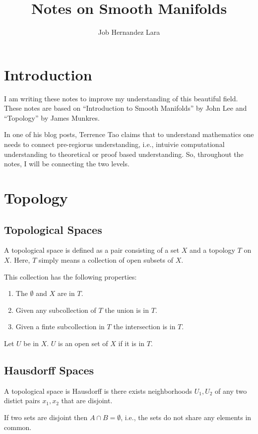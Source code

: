 \documentclass{article}
\title{Notes on Smooth Manifolds}
\author{Job Hernandez Lara}
\date{}
\begin{document}
\maketitle

\section{Introduction}
I am writing these notes to improve my understanding of this beautiful field.
These notes are based on ``Introduction to Smooth Manifolds'' by John Lee and ``Topology'' by James Munkres.

In one of his blog posts, Terrence Tao claims that to understand mathematics one needs to connect pre-regiorus understanding, i.e., intuivie computational understanding to theoretical or proof based understanding. So, throughout the notes, I will be connecting the two levels.

\section{Topology}

\subsection{Topological Spaces}

A topological space is defined as a pair consisting of a set $ X $ and a topology $ T $ on $ X $. Here, $ T $ simply means a collection of open subsets of $ X $.

This collection has the following properties:

\begin{enumerate}
\item The $ \emptyset $ and $ X $ are in $ T $.
\item Given any subcollection of $ T $ the union is in $ T $.
\item Given a finte subcollection in $ T $ the intersection is in $ T $.
\end{enumerate}

Let $ U $ be in $ X $. $ U $ is an open set of $ X $ if it is in $ T $.
\subsection{Hausdorff Spaces}
A topological space is Hausdorff is there exists neighborhoods $ U_{1}, U_{2} $ of any two distict pairs $ x_{1}, x_{2} $ that are disjoint.

If two sets are disjoint then $ A \cap B = \emptyset $, i.e., the sets do not share any elements in common.
\end{document}
